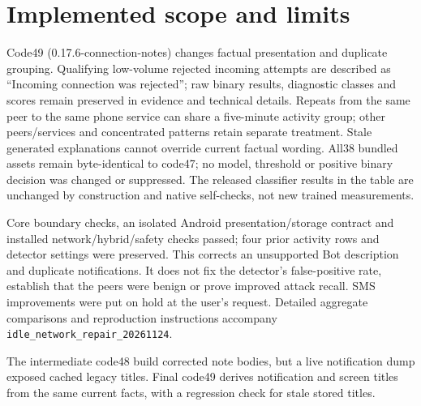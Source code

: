 \section{Implemented scope and limits}
Code49 (0.17.6-connection-notes) changes factual presentation and duplicate grouping. Qualifying low-volume rejected incoming attempts are described as ``Incoming connection was rejected''; raw binary results, diagnostic classes and scores remain preserved in evidence and technical details. Repeats from the same peer to the same phone service can share a five-minute activity group; other peers/services and concentrated patterns retain separate treatment. Stale generated explanations cannot override current factual wording. All38 bundled assets remain byte-identical to code47; no model, threshold or positive binary decision was changed or suppressed. The released classifier results in the table are unchanged by construction and native self-checks, not new trained measurements.

Core boundary checks, an isolated Android presentation/storage contract and installed network/hybrid/safety checks passed; four prior activity rows and detector settings were preserved. This corrects an unsupported Bot description and duplicate notifications. It does not fix the detector's false-positive rate, establish that the peers were benign or prove improved attack recall. SMS improvements were put on hold at the user's request. Detailed aggregate comparisons and reproduction instructions accompany \texttt{idle\_network\_repair\_20261124}.

The intermediate code48 build corrected note bodies, but a live notification dump exposed cached legacy titles. Final code49 derives notification and screen titles from the same current facts, with a regression check for stale stored titles.
